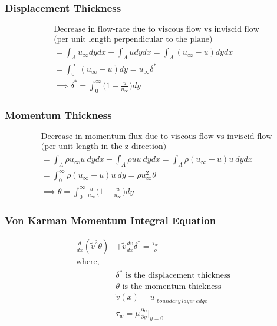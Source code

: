 \documentclass[11pt, letterpaper, notitlepage]{article}
\begin{document}
\subsubsection{Displacement Thickness}
\begin{align*}
& \text{Decrease in flow-rate due to viscous flow vs inviscid flow} \\
& \text{(per unit length perpendicular to the plane)} \\
&= \int_A u_\infty dy dx - \int_A u dy dx = \int_A (u_\infty - u) dy dx \\
&= \int_0^\infty (u_\infty-u) dy = u_\infty \delta^* \\
& \implies \boxed{\delta^* = \int_0^\infty \biggl(1-\frac{u}{u_\infty} \biggr) dy}
\end{align*}

\subsubsection{Momentum Thickness}
\begin{align*}
& \text{Decrease in momentum flux due to viscous flow vs inviscid flow} \\
& \text{(per unit length in the z-direction)} \\
&= \int_A \rho u_\infty u \ dy dx - \int_A \rho u u \ dy dx = \int_A \rho (u_\infty - u) u\ dy dx \\
&= \int_0^\infty \rho (u_\infty-u) u \ dy = \rho u^2_\infty \theta \\
& \implies \boxed{\theta = \int_0^\infty \frac{u}{u_\infty} \biggl(1-\frac{u}{u_\infty} \biggr) dy}
\end{align*}

\subsubsection{Von Karman Momentum Integral Equation}
\begin{align*}
\frac{d}{d x} (\tilde{v}^2 \theta) &+ \tilde{v} \frac{d \tilde{v}}{dx} \delta^* = \frac{\tau_w}{\rho} \\
\text{where, }& \\
& \delta^* \text{ is the displacement thickness} \\
& \theta \text{ is the momentum thickness} \\
& \tilde{v}(x) = u \rvert_{boundary\ layer\ edge} \\
& \tau_w = \mu \frac{\partial u}{\partial y} \biggr\rvert_{y=0}
\end{align*}
\end{document}
